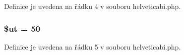 Definice je uvedena na řádku 4 v souboru helveticabi.\-php.

\hypertarget{helveticabi_8php_aadd3f841051043ee58e587e840e8dd0b}{
\subsubsection[{\$ut}]{\setlength{\rightskip}{0pt plus 5cm}\$ut = 50}}\label{helveticabi_8php_aadd3f841051043ee58e587e840e8dd0b}


Definice je uvedena na řádku 5 v souboru helveticabi.\-php.

